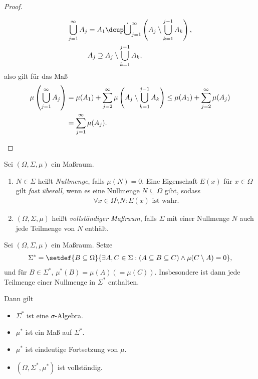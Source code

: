 \begin{proof}
\begin{enumerate}[label=(\roman{*})]
\begin{align*}
\bigcup_{j=1}^\infty A_j &= A_1 \dcup \dot{\bigcup}_{j=1}^\infty \left(A_j
\setminus \bigcup_{k=1}^{j-1} A_k\right),\\
& A_j \supseteq A_j
\setminus \bigcup_{k=1}^{j-1} A_k,
\end{align*}
also gilt für das Maß
\begin{align*}
\mu\left(\bigcup_{j=1}^\infty A_j \right) &= \mu(A_1) +
\sum\limits_{j=2}^\infty \mu\left(A_j
\setminus \bigcup_{k=1}^{j-1} A_k\right)
\le \mu(A_1) +
\sum\limits_{j=2}^\infty \mu(A_j) \\ &=\sum\limits_{j=1}^\infty
\mu(A_j).\qedhere
\end{align*}
\end{enumerate}
\end{proof}

\begin{defn}
\label{defn:3.12}
Sei $(\Omega,\Sigma,\mu)$ ein Maßraum.
\begin{enumerate}[label=\arabic{*}.)]
  \item $N\in\Sigma$ heißt \emph{Nullmenge}, falls $\mu(N) = 0$. Eine
  Eigenschaft $E(x)$ für $x\in\Omega$ gilt \emph{fast überall}, wenn es eine
  Nullmenge $N\subseteq\Omega$ gibt, sodass
  \begin{align*}
  \forall x\in \Omega\setminus N : E(x)\text{ ist wahr}.
  \end{align*}
  \item $(\Omega,\Sigma,\mu)$ heißt \emph{vollständiger Maßraum}, falls
  $\Sigma$ mit einer Nullmenge $N$ auch jede Teilmenge von $N$ 
  enthält.\fishhere
\end{enumerate}
\end{defn}
\begin{prop}
Sei $(\Omega,\Sigma,\mu)$ ein Maßraum. Setze
\begin{align*}
\Sigma^* = \setdef{B\subseteq\Omega}{\exists A,C\in\Sigma: (A\subseteq
B\subseteq C)\land \mu(C\setminus A) = 0},
\end{align*}
und für $B\in\Sigma^*$, $\mu^*(B) = \mu(A) (=\mu(C))$. Insbesondere ist dann
jede Teilmenge einer Nullmenge in $\Sigma^*$ enthalten.

Dann gilt
\begin{itemize}
  \item $\Sigma^*$ ist eine $\sigma$-Algebra.
  \item $\mu^*$ ist ein Maß auf $\Sigma^*$.
  \item $\mu^*$ ist eindeutige Fortsetzung von $\mu$.
  \item $(\Omega,\Sigma^*,\mu^*)$ ist vollständig.\fishhere
\end{itemize}
\end{prop}
